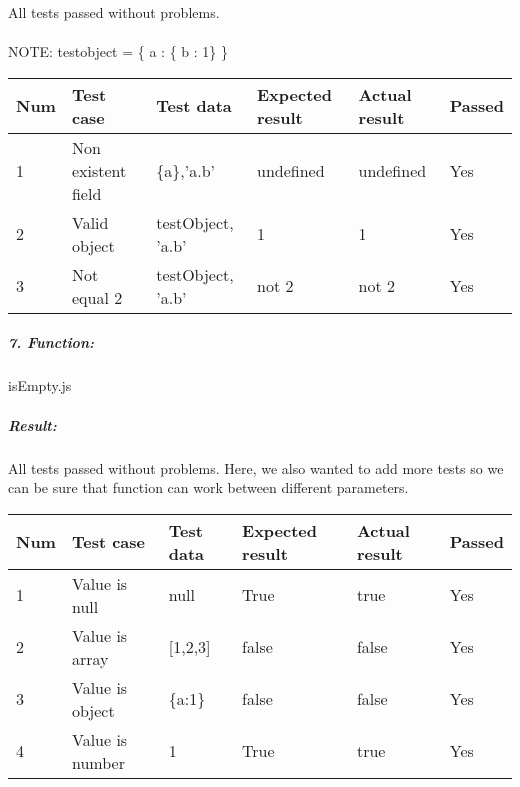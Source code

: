 \documentclass[a4paper, 12pt]{article}
\begin{document}
		All tests passed without problems.
\\
\\
    NOTE:
    testobject = \{ a : \{ b : 1\} \}
        \begin{table}[h!]
        	\begin{tabular}{|l|p{3cm}|p{2cm}|p{2cm}|p{2.5cm}|l|}
        		\hline
        		Num & Test case        					& Test data 					& Expected result 					& Actual result 		& Passed \\ \hline
        		1   & Non  existent field 				& \{a\},'a.b'     				& undefined               				& undefined             		& Yes     \\ \hline
        		2   & Valid object 						& testObject, 'a.b'     			& 1               				& 1             		& Yes     \\ \hline
        			3   & Not equal 2 						& testObject, 'a.b'     			& not 2               				& not 2             		& Yes     \\ \hline
        			
        				
        	\end{tabular}
        \end{table}

\newpage
		\hypertarget{header-n247}{%
		\subparagraph{7. Function:}\label{header-n247}}
		
		isEmpty.js
		
		\hypertarget{header-n260}{%
		\subparagraph{Result:}\label{header-n260}}
		
		All tests passed without problems. Here, we also wanted to add more tests so we can be sure that function can work between different parameters.

        \begin{table}[h!]
        	\begin{tabular}{|l|p{3cm}|p{2cm}|p{2cm}|p{2.5cm}|l|}
        		\hline
        		Num & Test case         						& Test data 					& Expected result 					& Actual result 		& Passed \\ \hline
        		1   & Value is null 										& null     						& True                				& true             		& Yes     \\ \hline
        		  		2   & Value is array 										& [1,2,3]     						& false                				& false             		& Yes     \\ \hline
        		  		  		3   & Value is object 										& \{a:1\}     						& false                				& false             		& Yes     \\ \hline
        		  		  		  		4   & Value is number 										& 1     						& True                				& true             		& Yes     \\ \hline
        		  		  		  		
        	\end{tabular}
        \end{table}
\end{document}
